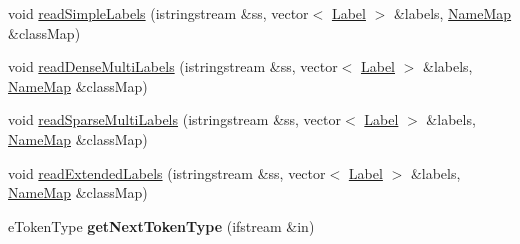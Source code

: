 \begin{DoxyCompactItemize}
\item 
void \hyperlink{classMultiBoost_1_1ArffParser_a82dc32253c2a46ac911e1d711135e6a4}{read\-Simple\-Labels} (istringstream \&ss, vector$<$ \hyperlink{structMultiBoost_1_1Label}{Label} $>$ \&labels, \hyperlink{classMultiBoost_1_1NameMap}{Name\-Map} \&class\-Map)
\item 
void \hyperlink{classMultiBoost_1_1ArffParser_a88b6c9ec11b95fb6da69f29f2390665f}{read\-Dense\-Multi\-Labels} (istringstream \&ss, vector$<$ \hyperlink{structMultiBoost_1_1Label}{Label} $>$ \&labels, \hyperlink{classMultiBoost_1_1NameMap}{Name\-Map} \&class\-Map)
\item 
void \hyperlink{classMultiBoost_1_1ArffParser_a749d5e5670c7778a526e8ad6b99976e7}{read\-Sparse\-Multi\-Labels} (istringstream \&ss, vector$<$ \hyperlink{structMultiBoost_1_1Label}{Label} $>$ \&labels, \hyperlink{classMultiBoost_1_1NameMap}{Name\-Map} \&class\-Map)
\item 
void \hyperlink{classMultiBoost_1_1ArffParser_a56a74bcda059d90bf60033440c42d9de}{read\-Extended\-Labels} (istringstream \&ss, vector$<$ \hyperlink{structMultiBoost_1_1Label}{Label} $>$ \&labels, \hyperlink{classMultiBoost_1_1NameMap}{Name\-Map} \&class\-Map)
\item 
\hypertarget{classMultiBoost_1_1ArffParser_a138d020be5fb621f64948e8cb0f2182f}{e\-Token\-Type {\bfseries get\-Next\-Token\-Type} (ifstream \&in)}\label{classMultiBoost_1_1ArffParser_a138d020be5fb621f64948e8cb0f2182f}

\end{DoxyCompactItemize}
